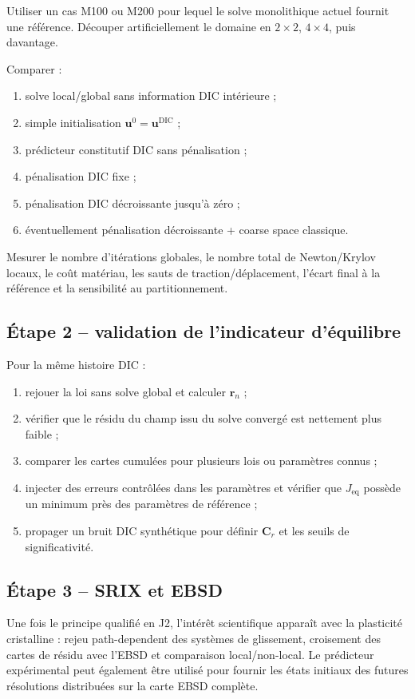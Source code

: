 \documentclass[11pt,a4paper]{article}
\newcommand{\udic}{\bm{u}^{\mathrm{DIC}}}
\newcommand{\Req}{\bm{r}}
\begin{document}
Utiliser un cas M100 ou M200 pour lequel le solve monolithique actuel fournit une référence. Découper
artificiellement le domaine en $2\times2$, $4\times4$, puis davantage.

Comparer :
\begin{enumerate}
  \item solve local/global sans information DIC intérieure ;
  \item simple initialisation $\bm{u}^0=\udic$ ;
  \item prédicteur constitutif DIC sans pénalisation ;
  \item pénalisation DIC fixe ;
  \item pénalisation DIC décroissante jusqu'à zéro ;
  \item éventuellement pénalisation décroissante + coarse space classique.
\end{enumerate}

Mesurer le nombre d'itérations globales, le nombre total de Newton/Krylov locaux, le coût matériau,
les sauts de traction/déplacement, l'écart final à la référence et la sensibilité au partitionnement.

\subsection{Étape 2 -- validation de l'indicateur d'équilibre}

Pour la même histoire DIC :
\begin{enumerate}
  \item rejouer la loi sans solve global et calculer $\Req_n$ ;
  \item vérifier que le résidu du champ issu du solve convergé est nettement plus faible ;
  \item comparer les cartes cumulées pour plusieurs lois ou paramètres connus ;
  \item injecter des erreurs contrôlées dans les paramètres et vérifier que $J_{\mathrm{eq}}$ possède un minimum près des paramètres de référence ;
  \item propager un bruit DIC synthétique pour définir $\bm{C}_r$ et les seuils de significativité.
\end{enumerate}

\subsection{Étape 3 -- SRIX et EBSD}

Une fois le principe qualifié en J2, l'intérêt scientifique apparaît avec la plasticité cristalline :
rejeu path-dependent des systèmes de glissement, croisement des cartes de résidu avec l'EBSD et
comparaison local/non-local. Le prédicteur expérimental peut également être utilisé pour fournir les
états initiaux des futures résolutions distribuées sur la carte EBSD complète.
\end{document}
